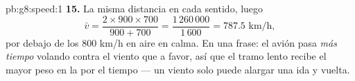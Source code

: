 \begin{solution}{pb:g8:speed:1}
\textbf{15.} La misma distancia en cada sentido, luego
\[
\bar v = \frac{2 \times 900 \times 700}{900 + 700}
= \frac{1\,260\,000}{1\,600} = 787.5 \text{ km/h},
\]
por debajo de los $800$ km/h en aire en calma. En una frase: el avión pasa
\emph{más tiempo} volando contra el viento que a favor, así que el tramo lento
recibe el mayor peso en la  por el tiempo --- un
viento solo puede alargar una ida y vuelta.
\end{solution}
